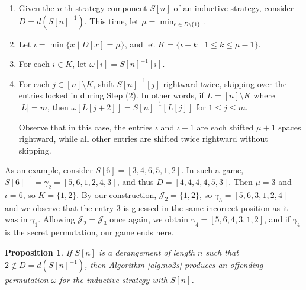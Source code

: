 \documentclass[article]{amsart}
\theoremstyle{plain}
\newtheorem{proposition}[theorem]{Proposition}
\begin{document}
\begin{algorithm}
\caption{Offending Permutation Constructor For $2 \notin D$} \label{alg:no2s}

\begin{enumerate}
    \item [(0)] Given the $n$-th strategy component $S[n]$ of an inductive strategy, consider $D = d\left( S[n]^{-1} \right)$. This time, let $\mu = \min_{e \in D \setminus \{1\}}$.

    \item Let $\iota = \min \{ x \mid D[x] = \mu \}$, and let $K = \{ \iota + k \mid 1 \leq k \leq \mu - 1 \}$. 
    
    \item For each $i \in K$, let $\omega[i] = S[n]^{-1}[i]$. 

    \item For each $j \in [n] \setminus K$, shift $S[n]^{-1}[j]$ rightward twice, skipping over the entries locked in during Step (2). In other words, if $L = [n] \setminus K$ where $|L| = m$, then $\omega[L[j+2]] = S[n]^{-1}[L[j]]$ for $1 \leq j \leq m$.

    Observe that in this case, the entries $\iota$ and $\iota-1$ are each shifted $\mu + 1$ spaces rightward, while all other entries are shifted twice rightward without skipping.
    
\end{enumerate}
\end{algorithm}

As an example, consider $S[6] = [3,4,6,5,1,2]$. In such a game, $S[6]^{-1} = \gamma_2 = [5,6,1,2,4,3]$, and thus $D = [4,4,4,4,5,3]$. Then $\mu = 3$ and $\iota = 6$, so $K = \{1,2\}$. By our construction, $\mathcal{J}_2 = \{1,2\}$, so $\gamma_3 = [5,6,3,1,2,4]$ and we observe that the entry 3 is guessed in the same incorrect position as it was in $\gamma_1$. Allowing $\mathcal{J}_2 = \mathcal{J}_3$ once again, we obtain $\gamma_4 = [5,6,4,3,1,2]$, and if $\gamma_4$ is the secret permutation, our game ends here. 

\begin{proposition} \label{prop:no2s}
    If $S[n]$ is a derangement of length $n$ such that $2 \notin D = d\left( S[n]^{-1} \right)$, then Algorithm \ref{alg:no2s} produces an offending permutation $\omega$ for the inductive strategy with $S[n]$.
\end{proposition}
\end{document}
